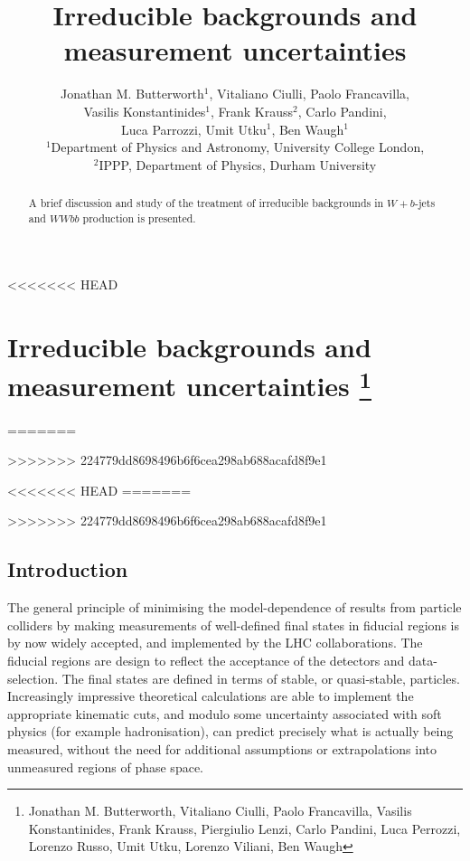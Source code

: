 \documentclass[11pt]{cernrep}
\begin{document}
 
<<<<<<< HEAD
\section{Irreducible backgrounds and measurement uncertainties \protect\footnote{Jonathan M. Butterworth, Vitaliano Ciulli, Paolo
  Francavilla, Vasilis Konstantinides, Frank Krauss, Piergiulio Lenzi, Carlo Pandini, Luca Perrozzi, Lorenzo Russo, Umit
  Utku, Lorenzo Viliani, Ben Waugh}}
=======
\title{Irreducible backgrounds and measurement uncertainties}

\author{Jonathan M. Butterworth$^1$, Vitaliano Ciulli, Paolo Francavilla,\\ Vasilis Konstantinides$^1$, Frank Krauss$^2$, Carlo Pandini,\\
Luca Parrozzi, Umit Utku$^1$, Ben Waugh$^1$ \\
$^1$Department of Physics and Astronomy, University College London,\\ 
$^2$IPPP, Department of Physics, Durham University}
>>>>>>> 224779dd8698496b6f6cea298ab688acafd8f9e1


<<<<<<< HEAD
=======
\begin{abstract}
A brief discussion and study of the treatment of irreducible backgrounds in $W+b$-jets and $WWbb$ production is presented.
\end{abstract}
>>>>>>> 224779dd8698496b6f6cea298ab688acafd8f9e1

\subsection{Introduction}
\label{sec:intro}

The general principle of minimising the model-dependence of results from particle colliders by making measurements of 
well-defined final states in fiducial regions is by now widely accepted, and implemented by the LHC collaborations. 
The fiducial regions are design to reflect  the acceptance of the detectors and data-selection. 
The final states are defined in terms of stable, or quasi-stable,
particles. Increasingly impressive theoretical calculations are able to implement the appropriate kinematic cuts, and
modulo some uncertainty associated with soft physics (for example hadronisation), can predict precisely what 
is actually being measured, without the need for additional assumptions or extrapolations into unmeasured regions of 
phase space.
\end{document}
